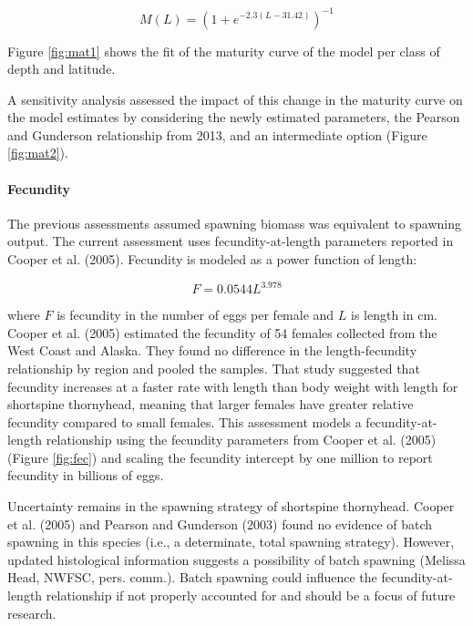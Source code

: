 \documentclass[11pt,
  letterpaper,
]{article}
\begin{document}
\begin{equation} M(L) = (1+e^{-2.3(L-31.42)})^{-1}\end{equation}

Figure \ref{fig:mat1} shows the fit of the maturity curve of the model per class of depth and latitude.

A sensitivity analysis assessed the impact of this change in the maturity curve on the model estimates by considering the newly estimated parameters, the Pearson and Gunderson relationship from 2013, and an intermediate option (Figure \ref{fig:mat2}).

\hypertarget{fecundity}{%
\paragraph{Fecundity}\label{fecundity}}

The previous assessments assumed spawning biomass was equivalent to spawning output. The current assessment uses fecundity-at-length parameters reported in Cooper et al. (2005). Fecundity is modeled as a power function of length:

\begin{equation} F = 0.0544L^{3.978} \end{equation}

where \(F\) is fecundity in the number of eggs per female and \(L\) is length in cm. Cooper et al. (2005) estimated the fecundity of 54 females collected from the West Coast and Alaska. They found no difference in the length-fecundity relationship by region and pooled the samples. That study suggested that fecundity increases at a faster rate with length than body weight with length for shortspine thornyhead, meaning that larger females have greater relative fecundity compared to small females. This assessment models a fecundity-at-length relationship using the fecundity parameters from Cooper et al. (2005) (Figure \ref{fig:fec}) and scaling the fecundity intercept by one million to report fecundity in billions of eggs.

Uncertainty remains in the spawning strategy of shortspine thornyhead. Cooper et al. (2005) and Pearson and Gunderson (2003) found no evidence of batch spawning in this species (i.e., a determinate, total spawning strategy). However, updated histological information suggests a possibility of batch spawning (Melissa Head, NWFSC, pers. comm.). Batch spawning could influence the fecundity-at-length relationship if not properly accounted for and should be a focus of future research.
\end{document}
